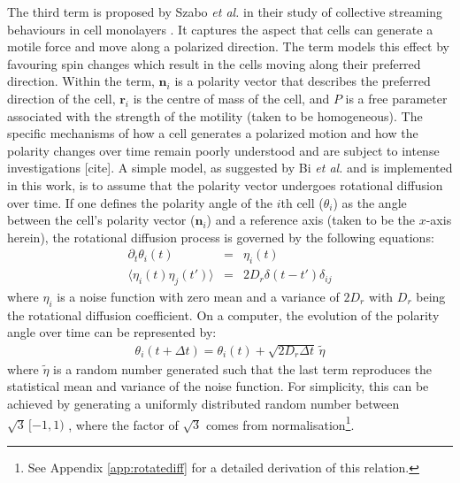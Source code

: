 \documentclass[a4paper,12pt]{article}
\begin{document}
The third term is proposed by Szabo \emph{et al.} in their study of collective streaming behaviours in cell monolayers \cite{szabo2010}. It captures the aspect that  cells can generate a motile force and move along a polarized direction. The term models this effect by favouring spin changes which result in the cells moving along their preferred direction. Within the term, $\bm{n}_i$ is a polarity vector that describes the preferred direction of the cell, $\bm{r}_i$ is the centre of mass of the cell, and $P$ is a free parameter associated with the strength of the motility (taken to be homogeneous). The specific mechanisms of how a cell generates a polarized motion and how the polarity changes over time remain poorly understood and are subject to intense investigations [cite]. A simple model, as suggested by Bi \emph{et al.} \cite{bi2015motility} and is implemented in this work, is to assume that the polarity vector undergoes rotational diffusion over time. If one defines the polarity angle of the $i$th cell ($\theta_i$) as the angle between the cell's polarity vector ($\bm{n}_i$) and a reference axis (taken to be the $x$-axis herein), the rotational diffusion process is governed by the following equations:
\begin{eqnarray}
\partial_t\theta_i(t) & = & \eta_i(t)\\
\langle{\eta_i(t)\eta_j(t')\rangle} & = & 2D_r\delta(t-t')\delta_{ij}
\end{eqnarray}
where $\eta_i$ is a noise function with zero mean and a variance of $2D_r$ with $D_r$ being the rotational diffusion coefficient. On a computer, the evolution of the polarity angle over time can be represented by:
\begin{eqnarray}
\label{eqn:computerRotateDiff}
\theta_i(t+\Delta t) = \theta_i(t) + \sqrt{2D_r\Delta t}\,\tilde\eta
\end{eqnarray}
where $\tilde\eta$ is a random number generated such that the last term reproduces the statistical mean and variance of the noise function. For simplicity, this can be achieved by generating a uniformly distributed random number between $\sqrt{3}\,[-1,1)$ , where the factor of $\sqrt{3}$ comes from normalisation\footnote{See Appendix \ref{app:rotatediff} for a detailed derivation of this relation.}.
\end{document}
